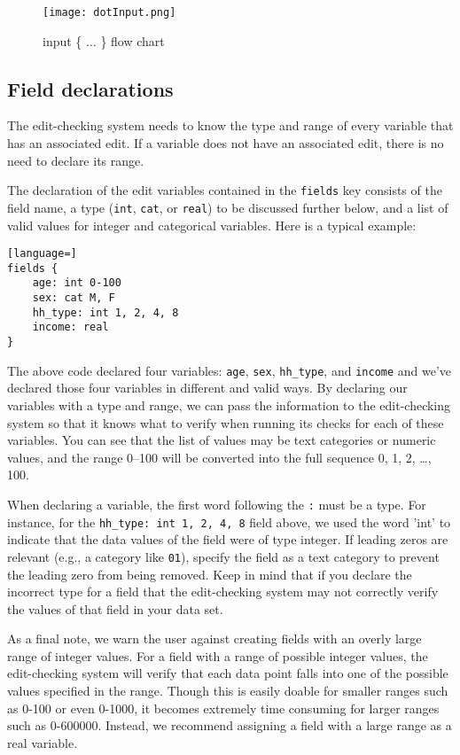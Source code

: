 \documentclass{article}
\begin{document}
\begin{figure}
\begin{center}
\texttt{[image: dotInput.png]}
\caption{input \{ $\ldots$ \} flow chart}\label{inputfigure}
\end{center}
\end{figure}

\subsection{Field declarations} The edit-checking system needs to know the type and range
of every variable that has an associated edit. If a variable does not have an associated
edit, there is no need to declare its range.

The declaration of the edit variables contained in the {\tt fields} key consists of the field name, 
a type ({\tt int}, {\tt cat}, or 
{\tt real}) to be discussed further below, and a list of valid values for integer and categorical variables. Here is a typical example:

\begin{lstlisting}[language=]
fields {
    age: int 0-100
    sex: cat M, F
    hh_type: int 1, 2, 4, 8
    income: real
}
\end{lstlisting}

The above code declared four variables: {\tt age}, {\tt sex}, {\tt hh\_type}, and
{\tt income} and we've declared those four variables in different and valid ways.
By declaring our variables with a type and range, we can pass the information to the
edit-checking system so that it knows what to verify when running its checks for each
of these variables.  You can see that the list of values may be text categories or
numeric values, and the range 0--100 will be converted into the full sequence 0, 1,
2, \dots, 100.

When declaring a variable, the first word following the {\tt :} must be a type. For instance, 
for the {\tt hh\_type: int 1, 2, 4, 8} field above, we used the word 'int' to indicate that 
the data values of the field were of type integer. If leading zeros are relevant (e.g.,
a category like {\tt 01}), specify the field as a text category to prevent the leading
zero from being removed.  Keep in mind 
that if you declare the incorrect type for a field that the edit-checking system may not correctly 
verify the values of that field in your data set.

As a final note, we warn the user against creating fields with an overly large range of
integer values. For a field with a range of possible integer values, the edit-checking
system will verify that each data point falls into one of the possible values specified
in the range. Though this is easily doable for smaller ranges such as 0-100 or even
0-1000, it becomes extremely time consuming for larger ranges such as 0-600000. Instead,
we recommend assigning a field with a large range as a real variable.
\end{document}
